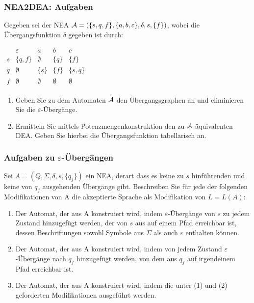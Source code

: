 \documentclass{beamer}
\begin{document}
\begin{frame}
	\frametitle{NEA2DEA: Aufgaben}
Gegeben sei der NEA ${\cal A}=(\{s,q,f\},\{a,b,c\},\delta,s,\{f\})$, wobei
die Übergangsfunktion $\delta$ gegeben ist durch:
\begin{center}
$\begin{array}{r|cccc}
&\varepsilon & a & b & c\\\hline
s & \{q,f\} & \emptyset & \{q\} &\{f\}\\
q &  \emptyset & \{s\} & \{f\} & \{s,q\}\\
f & \emptyset & \emptyset &  \emptyset &  \emptyset\\
\end{array}$
\end{center}
\begin{enumerate}
\item Geben Sie zu dem Automaten ${\cal A}$ den Übergangsgraphen an und eliminieren
Sie die $\varepsilon$-Übergänge.
\item Ermitteln Sie mittels Potenzmengenkonstruktion den zu ${\cal A}$ äquivalenten
DEA. Geben Sie hierbei die Übergangsfunktion tabellarisch an.
\end{enumerate}
\end{frame}
\begin{frame}	
\frametitle{Aufgaben zu \(\varepsilon\)-Übergängen}
Sei $A=(Q,\Sigma, \delta, s, \{q_f\})$ ein NEA, derart dass es keine zu $s$ hinführenden und keine von $q_f$ ausgehenden Übergänge gibt. Beschreiben Sie für jede der folgenden Modifikationen von A die akzeptierte Sprache als Modifikation von $L=L(A)$:
\begin{enumerate}
\item Der Automat, der aus A konstruiert wird, indem $\varepsilon$-Übergänge von $s$ zu jedem Zustand hinzugefügt werden, der von $s$ aus auf einem Pfad erreichbar ist, dessen Beschriftungen sowohl Symbole aus $\Sigma$ als auch $\varepsilon$ enthalten können.
\item Der Automat, der aus A konstruiert wird, indem von jedem Zustand $\varepsilon$-Übergänge nach $q_f$ hinzugefügt werden, von dem aus $q_f$ auf irgendeinem Pfad erreichbar ist.
\item Der Automat, der aus A konstruiert wird, indem die unter (1) und (2) geforderten Modifikationen ausgeführt werden.
\end{enumerate}

\end{frame}
\end{document}
